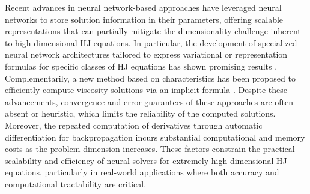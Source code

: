 \documentclass[review,hidelinks,onefignum,onetabnum]{siamart250106}
\begin{document}
Recent advances in neural network-based approaches \cite{sirignano2018dgm, yu2018deep, raissi2019physics, lu2019deeponet, li2020fourier, yang2023context} have leveraged neural networks to store solution information in their parameters, offering scalable representations that can partially mitigate the dimensionality challenge inherent to high-dimensional HJ equations. In particular, the development of specialized neural network architectures tailored to express variational or representation formulas for specific classes of HJ equations has shown promising results \cite{darbon2020overcoming, darbon2021some, darbon2023neural}. Complementarily, a new method based on characteristics has been proposed to efficiently compute viscosity solutions via an implicit formula \cite{park2025implicit}.  
Despite these advancements, convergence and error guarantees of these approaches are often absent or heuristic, which limits the reliability of the computed solutions. Moreover, the repeated computation of derivatives through automatic differentiation for backpropagation incurs substantial computational and memory costs as the problem dimension increases. These factors constrain the practical scalability and efficiency of neural solvers for extremely high-dimensional HJ equations, particularly in real-world applications where both accuracy and computational tractability are critical.


\begin{table}[t]
\centering
\caption{Comparison of computational paradigms for solving Hamilton--Jacobi equations. 
The proposed fixed-point method performs \emph{direct local evaluation}, 
deep learning methods represent a \emph{global approximation} requiring prior training, 
and WENO is an \emph{evolutionary solver} advancing solutions causally in time.}
\vspace{4pt}
\label{tab:method_comparison}
\end{table}
\end{document}
